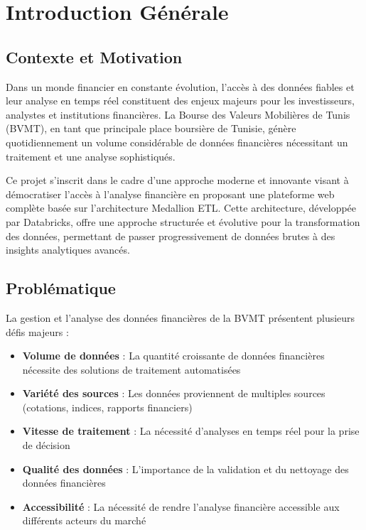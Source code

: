 \chapter*{Introduction Générale}


\section*{Contexte et Motivation}

Dans un monde financier en constante évolution, l'accès à des données fiables et leur analyse en temps réel constituent des enjeux majeurs pour les investisseurs, analystes et institutions financières. La Bourse des Valeurs Mobilières de Tunis (BVMT), en tant que principale place boursière de Tunisie, génère quotidiennement un volume considérable de données financières nécessitant un traitement et une analyse sophistiqués.

Ce projet s'inscrit dans le cadre d'une approche moderne et innovante visant à démocratiser l'accès à l'analyse financière en proposant une plateforme web complète basée sur l'architecture Medallion ETL. Cette architecture, développée par Databricks, offre une approche structurée et évolutive pour la transformation des données, permettant de passer progressivement de données brutes à des insights analytiques avancés.

\section*{Problématique}

La gestion et l'analyse des données financières de la BVMT présentent plusieurs défis majeurs :

\begin{itemize}
    \item \textbf{Volume de données} : La quantité croissante de données financières nécessite des solutions de traitement automatisées
    \item \textbf{Variété des sources} : Les données proviennent de multiples sources (cotations, indices, rapports financiers)
    \item \textbf{Vitesse de traitement} : La nécessité d'analyses en temps réel pour la prise de décision
    \item \textbf{Qualité des données} : L'importance de la validation et du nettoyage des données financières
    \item \textbf{Accessibilité} : La nécessité de rendre l'analyse financière accessible aux différents acteurs du marché
\end{itemize}

